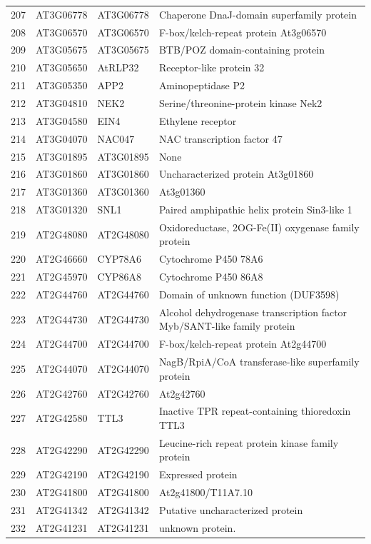 \documentclass[11pt]{article}
\begin{document}
\begin{center}
\begin{tabular}{rlll}
207 & AT3G06778 & AT3G06778 & Chaperone DnaJ-domain superfamily protein\\
208 & AT3G06570 & AT3G06570 & F-box/kelch-repeat protein At3g06570\\
209 & AT3G05675 & AT3G05675 & BTB/POZ domain-containing protein\\
210 & AT3G05650 & AtRLP32 & Receptor-like protein 32\\
211 & AT3G05350 & APP2 & Aminopeptidase P2\\
212 & AT3G04810 & NEK2 & Serine/threonine-protein kinase Nek2\\
213 & AT3G04580 & EIN4 & Ethylene receptor\\
214 & AT3G04070 & NAC047 & NAC transcription factor 47\\
215 & AT3G01895 & AT3G01895 & None\\
216 & AT3G01860 & AT3G01860 & Uncharacterized protein At3g01860\\
217 & AT3G01360 & AT3G01360 & At3g01360\\
218 & AT3G01320 & SNL1 & Paired amphipathic helix protein Sin3-like 1\\
219 & AT2G48080 & AT2G48080 & Oxidoreductase, 2OG-Fe(II) oxygenase family protein\\
220 & AT2G46660 & CYP78A6 & Cytochrome P450 78A6\\
221 & AT2G45970 & CYP86A8 & Cytochrome P450 86A8\\
222 & AT2G44760 & AT2G44760 & Domain of unknown function (DUF3598)\\
223 & AT2G44730 & AT2G44730 & Alcohol dehydrogenase transcription factor Myb/SANT-like family protein\\
224 & AT2G44700 & AT2G44700 & F-box/kelch-repeat protein At2g44700\\
225 & AT2G44070 & AT2G44070 & NagB/RpiA/CoA transferase-like superfamily protein\\
226 & AT2G42760 & AT2G42760 & At2g42760\\
227 & AT2G42580 & TTL3 & Inactive TPR repeat-containing thioredoxin TTL3\\
228 & AT2G42290 & AT2G42290 & Leucine-rich repeat protein kinase family protein\\
229 & AT2G42190 & AT2G42190 & Expressed protein\\
230 & AT2G41800 & AT2G41800 & At2g41800/T11A7.10\\
231 & AT2G41342 & AT2G41342 & Putative uncharacterized protein\\
232 & AT2G41231 & AT2G41231 & unknown protein.\\

\end{tabular}
\end{center}
\end{document}
